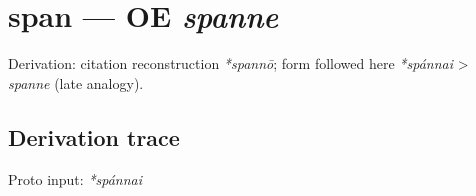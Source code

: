 \documentclass[
  british,
  a4paper,
  openany]{book}
\providecommand{\texorpdfstring}[2]{#1}
\begin{document}
\section{\texorpdfstring{span --- OE
\emph{spanne}}{span --- OE spanne}}\label{span-oe-spanne}


Derivation: citation reconstruction \emph{*spannō}; form followed here
\emph{*spánnai} \textgreater{} \emph{spanne} (late analogy).

\subsection{Derivation trace}\label{derivation-trace-124}

Proto input: \emph{*spánnai}

\begingroup
\setlength{\fboxsep}{6pt}
\end{document}
